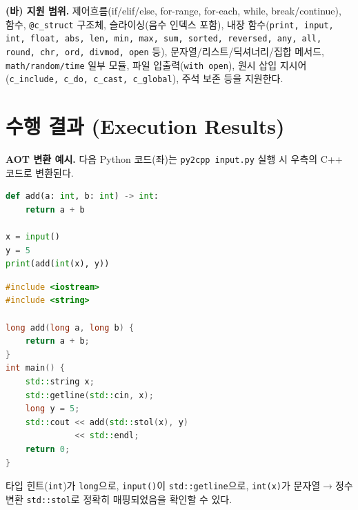 \documentclass[10pt]{article}
\begin{document}
\textbf{(바) 지원 범위.} 제어흐름(if/elif/else, for-range, for-each, while, break/continue), 함수, \texttt{@c\_struct} 구조체, 슬라이싱(음수 인덱스 포함), 내장 함수(\texttt{print, input, int, float, abs, len, min, max, sum, sorted, reversed, any, all, round, chr, ord, divmod, open} 등), 문자열/리스트/딕셔너리/집합 메서드, \texttt{math/random/time} 일부 모듈, 파일 입출력(\texttt{with open}), 원시 삽입 지시어(\texttt{c\_include, c\_do, c\_cast, c\_global}), 주석 보존 등을 지원한다.

\section{수행 결과 (Execution Results)}
\textbf{AOT 변환 예시.} 다음 Python 코드(좌)는 \texttt{py2cpp input.py} 실행 시 우측의 C++ 코드로 변환된다.

\begin{minipage}[t]{0.49\textwidth}
\begin{lstlisting}[language=Python]
def add(a: int, b: int) -> int:
    return a + b

x = input()
y = 5
print(add(int(x), y))
\end{lstlisting}
\end{minipage}\hfill
\begin{minipage}[t]{0.49\textwidth}
\begin{lstlisting}[language=C++]
#include <iostream>
#include <string>

long add(long a, long b) {
    return a + b;
}
int main() {
    std::string x;
    std::getline(std::cin, x);
    long y = 5;
    std::cout << add(std::stol(x), y)
              << std::endl;
    return 0;
}
\end{lstlisting}
\end{minipage}

타입 힌트(\texttt{int})가 \texttt{long}으로, \texttt{input()}이 \texttt{std::getline}으로, \texttt{int(x)}가 문자열$\to$정수 변환 \texttt{std::stol}로 정확히 매핑되었음을 확인할 수 있다.
\end{document}

